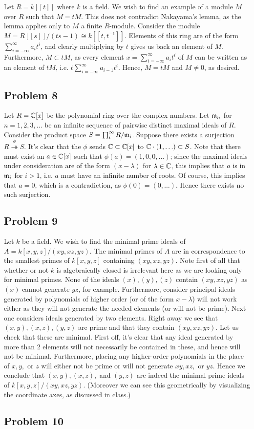 \documentclass{../../mathnotes}
\begin{document}
Let $R=k[ [t]]$ where $k$ is a field. We wish to find an example of a module $M$ over $R$ such that $M=tM$. This does not contradict Nakayama's
lemma, as the lemma applies only to $M$ a finite $R$-module. Consider the module $M=R[ [s]]/(ts-1)\cong k[ [ t,t^{-1}]]$.
Elements of this ring are of the form $\sum_{i=-\infty}^{\infty} a_i t^i$, and clearly multiplying by $t$ gives us back an element of $M$.
Furthermore, $M\subset tM$, as every element $x=\sum_{i=-\infty}^{\infty} a_i t^i$ of $M$ can be written as an element of $tM$, i.e. $t\sum_{i=-\infty}^{\infty} a_{i-1} t^i$.
Hence, $M=tM$ and $M\neq 0$, as desired.

\subsection*{Problem 8}

Let $R=\mathbb{C}[x]$ be the polynomial ring over the complex numbers. Let $\mathfrak m_n$ for $n=1,2,3,\ldots$ be an infinite sequence of pairwise distinct maximal
ideals of $R$. Consider the product space $S=\prod_i^\infty R/\mathfrak m_i$. Suppose there exists a surjection $R\overset{\phi}{\twoheadrightarrow}S$.
It's clear that the $\phi$ sends $\mathbb{C}\subset\mathbb{C}[x]$ to $\mathbb{C}\cdot (1,\ldots)\subset S$.
Note that there must exist an $a\in\mathbb{C}[x]$ such that $\phi(a)=(1,0,0,\ldots)$; since the maximal ideals under consideration are of the form $(x-\lambda)$ for
$\lambda\in\mathbb{C}$, this implies that $a$ is in $\mathfrak m_i$ for $i>1$, i.e. $a$ must have an infinite number of roots. Of course, this implies that $a=0$,
which is a contradiction, as $\phi(0)=(0,\ldots)$. Hence there exists no such surjection.

\subsection*{Problem 9}

Let $k$ be a field. We wish to find the minimal prime ideals of $A=k[x,y,z]/(xy,xz,yz)$. The minimal primes of $A$ are in correspondence to the
smallest primes of $k[x,y,z]$ containing $(xy, xz, yz)$. Note first of all that whether or not $k$ is algebraically closed is irrelevant here as
we are looking only for minimal primes. None of the ideals $(x),(y),(z)$ contain $(xy,xz,yz)$ as $(x)$ cannot generate $yz$, for example. Furthermore,
consider principal ideals generated by polynomials of higher order (or of the form $x-\lambda$) will not work either as they will not generate
the needed elements (or will not be prime). Next one considers ideals generated by two elements. Right away we see that $(x,y),(x,z),(y,z)$ are prime
and that they contain $(xy,xz,yz)$. Let us check that these are minimal. First off, it's clear that any ideal generated by more than 2 elements will not
necessarily be contained in these, and hence will not be minimal. Furthermore, placing any higher-order polynomials in the place of $x,y,$ or $z$ will
either not be prime or will not generate $xy,xz,$ or $yz$. Hence we conclude that $(x,y),(x,z),$ and $(y,z)$ are indeed the minimal prime ideals of
$k[x,y,z]/(xy,xz,yz)$.
(Moreover we can see this geometrically by visualizing the coordinate axes, as discussed in class.)

\subsection*{Problem 10}
\end{document}
